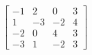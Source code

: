 %
\begin{equation*}
\begin{bmatrix}
 -1 & 2 & 0 & 3 \\
 1 & -3 & -2 & 4 \\
 -2 & 0 & 4 & 3 \\
 -3 & 1 & -2 & 3
\end{bmatrix}
\end{equation*}
%
